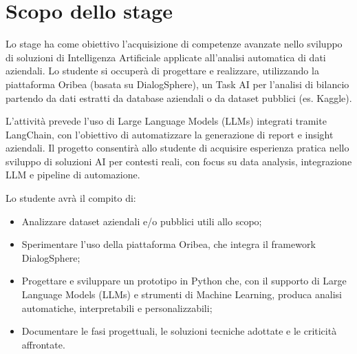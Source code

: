 \section*{Scopo dello stage}
Lo stage ha come obiettivo l'acquisizione di competenze avanzate nello sviluppo di soluzioni di Intelligenza Artificiale applicate all’analisi automatica di dati aziendali.
Lo studente si occuperà di progettare e realizzare, utilizzando la piattaforma Oribea (basata su DialogSphere), un Task AI per l’analisi di bilancio partendo da dati estratti da database aziendali o da dataset pubblici (es. Kaggle).

L’attività prevede l’uso di Large Language Models (LLMs) integrati tramite LangChain, con l’obiettivo di automatizzare la generazione di report e insight aziendali.
Il progetto consentirà allo studente di acquisire esperienza pratica nello sviluppo di soluzioni AI per contesti reali, con focus su data analysis, integrazione LLM e pipeline di automazione.

Lo studente avrà il compito di:
\begin{itemize}
 \item Analizzare dataset aziendali e/o pubblici utili allo scopo;
 \item Sperimentare l’uso della piattaforma Oribea, che integra il framework DialogSphere;
 \item Progettare e sviluppare un prototipo in Python che, con il supporto di Large Language Models (LLMs) e strumenti di Machine Learning, produca analisi automatiche, interpretabili e personalizzabili;
 \item Documentare le fasi progettuali, le soluzioni tecniche adottate e le criticità affrontate.
\end{itemize}